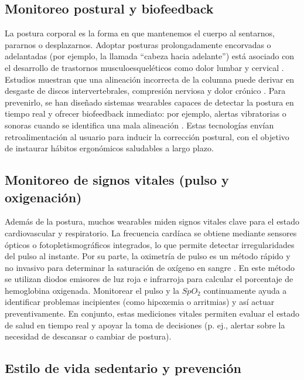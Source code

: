 \documentclass[manuscript,screen,review]{acmart}
\begin{document}
\subsection{Monitoreo postural y biofeedback}
La postura corporal es la forma en que mantenemos el cuerpo al sentarnos, pararnos o desplazarnos. Adoptar posturas prolongadamente encorvadas o adelantadas (por ejemplo, la llamada “cabeza hacia adelante”) está asociado con el desarrollo de trastornos musculoesqueléticos como dolor lumbar y cervical \cite{Simpson2019}. Estudios muestran que una alineación incorrecta de la columna puede derivar en desgaste de discos intervertebrales, compresión nerviosa y dolor crónico \cite{Simpson2019}. Para prevenirlo, se han diseñado sistemas wearables capaces de detectar la postura en tiempo real y ofrecer biofeedback inmediato: por ejemplo, alertas vibratorias o sonoras cuando se identifica una mala alineación \cite{Figueira2024}. Estas tecnologías envían retroalimentación al usuario para inducir la corrección postural, con el objetivo de instaurar hábitos ergonómicos saludables a largo plazo.

\subsection{Monitoreo de signos vitales (pulso y oxigenación)}
Además de la postura, muchos wearables miden signos vitales clave para el estado cardiovascular y respiratorio. La frecuencia cardíaca se obtiene mediante sensores ópticos o fotopletismográficos integrados, lo que permite detectar irregularidades del pulso al instante. Por su parte, la oximetría de pulso es un método rápido y no invasivo para determinar la saturación de oxígeno en sangre \cite{Torp2023}. En este método se utilizan diodos emisores de luz roja e infrarroja para calcular el porcentaje de hemoglobina oxigenada. Monitorear el pulso y la $SpO_2$ continuamente ayuda a identificar problemas incipientes (como hipoxemia o arritmias) y así actuar preventivamente. En conjunto, estas mediciones vitales permiten evaluar el estado de salud en tiempo real y apoyar la toma de decisiones (p. ej., alertar sobre la necesidad de descansar o cambiar de postura).

\subsection{Estilo de vida sedentario y prevención}
\end{document}
